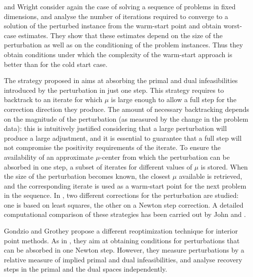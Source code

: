 \yildirim and Wright \cite{YildirimWright} consider again the case 
of solving a sequence of problems in fixed dimensions, and
analyse the number of iterations required to converge to a 
solution of the perturbed instance from the warm-start point and 
obtain worst-case estimates.
They show that these estimates depend on the size of the perturbation 
as well as on the conditioning %
of the problem 
instances. Thus they obtain conditions under which the complexity 
of the warm-start approach is better than for the cold start case.

The strategy proposed in \cite{YildirimWright} aims at absorbing the 
primal and dual infeasibilities introduced by the perturbation in just 
one step.
This strategy requires to backtrack to an iterate for which $\mu$ is 
large enough to allow a full step for the correction direction they produce. 
The amount of necessary backtracking depends on the magnitude 
of the perturbation (as measured by the change in the problem data):
this is intuitively justified considering that a large perturbation 
will produce a large adjustment, and it is essential to guarantee that 
a full step will not compromise the positivity requirements of the 
iterate.
%
To ensure the availability of an approximate $\mu$-center from which 
the perturbation can be absorbed in one step, a subset of 
iterates for different values of $\mu$ is stored.
When the size of the perturbation becomes known, the closest $\mu$ 
available is retrieved, and the corresponding iterate is used as a 
warm-start point for the next problem in the sequence.
%
In \cite{YildirimWright}, two different corrections for the perturbation
are studied: one is based on least squares, the other on a Newton step 
correction.
A detailed computational comparison of these strategies has been 
carried out by John and \yildirim \cite{JohnYildirim}.

Gondzio and Grothey \cite{GondzioGrothey03} propose a different 
reoptimization technique for interior point methods.
As in \cite{YildirimWright}, they aim at obtaining conditions for 
perturbations that can be absorbed in one Newton step.
However, they measure perturbations by a relative measure of implied
primal and dual infeasibilities, and analyse recovery steps in
the primal and the dual spaces independently.

